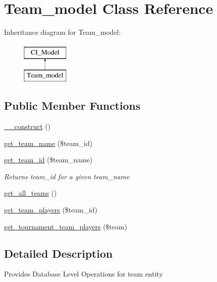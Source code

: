 \hypertarget{class_team__model}{}\section{Team\+\_\+model Class Reference}
\label{class_team__model}
Inheritance diagram for Team\+\_\+model\+:\begin{figure}[H]
\begin{center}
\leavevmode
\includegraphics[height=2.000000cm]{class_team__model}
\end{center}
\end{figure}
\subsection*{Public Member Functions}
\begin{DoxyCompactItemize}
\item 
\hyperlink{class_team__model_a095c5d389db211932136b53f25f39685}{\+\_\+\+\_\+construct} ()
\item 
\hyperlink{class_team__model_a2138279ea2e6b6ab7819f799e55be0b1}{get\+\_\+team\+\_\+name} (\$team\+\_\+id)
\item 
\hyperlink{class_team__model_af4e80eb207d15ec28c6b1872b0c827b4}{get\+\_\+team\+\_\+id} (\$team\+\_\+name)
\begin{DoxyCompactList}\small\item\em Returns {\ttfamily team\+\_\+id} for a given {\ttfamily team\+\_\+name} \end{DoxyCompactList}\item 
\hyperlink{class_team__model_a762b57e56b4ea13efa861ca9d15c13ec}{get\+\_\+all\+\_\+teams} ()
\item 
\hyperlink{class_team__model_a4f0532d5369dcb9ed895d7e081e0fae1}{get\+\_\+team\+\_\+players} (\$team\+\_\+id)
\item 
\hyperlink{class_team__model_a83d99271e04e61807320b5b9b7d12030}{get\+\_\+tournament\+\_\+team\+\_\+players} (\$team)
\end{DoxyCompactItemize}


\subsection{Detailed Description}
Provides Database Level Operations for {\ttfamily team} entity 

